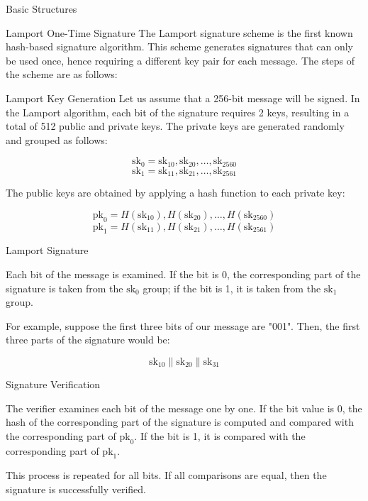 \begin{section}{Basic Structures}
\begin{subsection}{Lamport One-Time Signature}
	 The Lamport signature scheme is the first known hash-based signature algorithm. This scheme generates signatures that can only be used once, hence requiring a different key pair for each message. The steps of the scheme are as follows:

	 \begin{subsubsection}{Lamport Key Generation}
		 Let us assume that a 256-bit message will be signed. In the Lamport algorithm, each bit of the signature requires 2 keys, resulting in a total of 512 public and private keys. The private keys are generated randomly and grouped as follows:

		 \[
			 \text{sk}_0 = \text{sk}_{10}, \text{sk}_{20}, \ldots, \text{sk}_{2560}
		 \]
		 \[
			 \text{sk}_1 = \text{sk}_{11}, \text{sk}_{21}, \ldots, \text{sk}_{2561}
		 \]

		 The public keys are obtained by applying a hash function to each private key:

		 \[
			 \text{pk}_0 = H(\text{sk}_{10}), H(\text{sk}_{20}), \ldots, H(\text{sk}_{2560})
		 \]
		 \[
			 \text{pk}_1 = H(\text{sk}_{11}), H(\text{sk}_{21}), \ldots, H(\text{sk}_{2561}) \]

	 \end{subsubsection}

	 \begin{subsubsection}{Lamport Signature}

		 Each bit of the message is examined. If the bit is 0, the corresponding part of the signature is taken from the \(\text{sk}_0\) group; if the bit is 1, it is taken from the \(\text{sk}_1\) group.

		 For example, suppose the first three bits of our message are "001". Then, the first three parts of the signature would be:

		 \[
			 \text{sk}_{10} \| \text{sk}_{20} \| \text{sk}_{31}
		 \]

	 \end{subsubsection}

	 \begin{subsubsection}{Signature Verification}

		 The verifier examines each bit of the message one by one. If the bit value is 0, the hash of the corresponding part of the signature is computed and compared with the corresponding part of \(\text{pk}_0\). If the bit is 1, it is compared with the corresponding part of \(\text{pk}_1\).

		 This process is repeated for all bits. If all comparisons are equal, then the signature is successfully verified.


\end{subsubsection}
\end{subsection}
\end{section}
